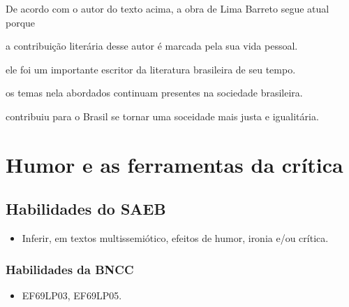 De acordo com o autor do texto acima, a obra de Lima Barreto segue atual 
porque 

\begin{escolha}

  \item a contribuição literária desse autor é marcada pela sua vida pessoal.

  \item ele foi um importante escritor da literatura brasileira de seu tempo.
  
  \item os temas nela abordados continuam presentes na sociedade brasileira.
  
  \item contribuiu para o Brasil se tornar uma soceidade mais justa e igualitária.

\end{escolha}


\chapter{Humor e as ferramentas da crítica}

\section*{Habilidades do SAEB}

\begin{itemize}

  \item Inferir, em textos multissemiótico, efeitos de humor, ironia e/ou
  crítica.

\end{itemize}

\subsection{Habilidades da BNCC}

\begin{itemize}

  \item EF69LP03, EF69LP05.

\end{itemize}

